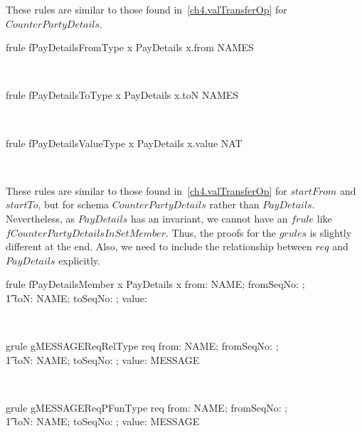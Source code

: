 These rules are similar to those found in~\ref{ch4.valTransferOp} for $CounterPartyDetails$.
%
\begin{LFRT}
\begin{theorem}{frule fPayDetailsFromType}
   x \in PayDetails \implies x.from \in NAMES
\end{theorem}~\end{LFRT}

\begin{LFRT}
\begin{theorem}{frule fPayDetailsToType}
   x \in PayDetails \implies x.toN \in NAMES
\end{theorem}~\end{LFRT}

\begin{LFRT}
\begin{theorem}{frule fPayDetailsValueType}
   x \in PayDetails \implies x.value \in NAT
\end{theorem}~\end{LFRT}

These rules are similar to those found in~\ref{ch4.valTransferOp}
for $startFrom$ and $startTo$, but for schema $CounterPartyDetails$
rather than $PayDetails$. Nevertheless, as $PayDetails$ has an
invariant, we cannot have an $frule$ like
$fCounterPartyDetailsInSetMember$. Thus, the proofs for the $grules$
is slightly different at the end. Also, we need to include the
relationship between $req$ and $PayDetails$ explicitly.
%
\begin{LFRT}
\begin{theorem}{frule fPayDetailsMember}
    x \in  PayDetails \implies  x \in  \lblot from: NAME; fromSeqNo: \nat; \\
        \t1 toN: NAME; toSeqNo: \nat; value: \nat \rblot
\end{theorem}~\end{LFRT}

\begin{LGRT}
\begin{theorem}{grule gMESSAGEReqRelType}
   req \in  \lblot from: NAME; fromSeqNo: \nat; \\
        \t1 toN: NAME; toSeqNo: \nat; value: \nat \rblot  \rel MESSAGE
\end{theorem}~\end{LGRT}

\begin{LGRT}
\begin{theorem}{grule gMESSAGEReqPFunType}
  req \in  \lblot from: NAME; fromSeqNo: \nat; \\
        \t1 toN: NAME; toSeqNo: \nat; value: \nat \rblot  \pfun MESSAGE
\end{theorem}~\end{LGRT}

